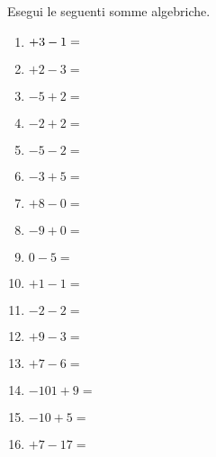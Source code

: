 \begin{esercizio}
Esegui le seguenti somme algebriche.
 \label{ese:2.14}

\vspace{-1em}
 \begin{multicols}{4}
 \begin{enumerate}[noitemsep, label=(\alph*)]
 \item \(+3 -1 = \ph{+2}\)
 \item \(+2 -3 =\)
 \item \(-5 +2 =\)
 \item \(-2 +2 =\)
 \item \(-5 -2 =\)
 \item \(-3 +5 =\)
 \item \(+8 -0 =\)
 \item \(-9 +0 =\)
 \item \(0 -5 =\)
 \item \(+1 -1 =\)
 \item \(-2 -2 =\)
 \item \(+9 -3 =\)
 \item \(+7 -6 =\)
 \item \(-101 +9 =\)
 \item \(-10 +5 =\)
 \item \(+7 -17 =\)
 \end{enumerate}
\end{multicols}
\end{esercizio}

